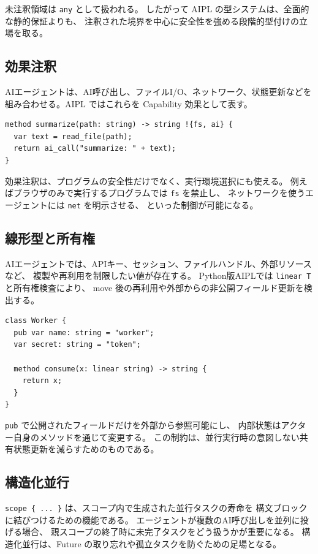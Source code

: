 \documentclass[11pt,a4paper,uplatex,dvipdfmx]{jsarticle}
\newcommand{\code}[1]{\texttt{#1}}
\begin{document}
未注釈領域は \code{any} として扱われる。
したがって AIPL の型システムは、全面的な静的保証よりも、
注釈された境界を中心に安全性を強める段階的型付けの立場を取る。

\subsection{効果注釈}

AIエージェントは、AI呼び出し、ファイルI/O、ネットワーク、状態更新などを
組み合わせる。AIPL ではこれらを Capability 効果として表す。

\begin{lstlisting}
method summarize(path: string) -> string !{fs, ai} {
  var text = read_file(path);
  return ai_call("summarize: " + text);
}
\end{lstlisting}

効果注釈は、プログラムの安全性だけでなく、実行環境選択にも使える。
例えばブラウザのみで実行するプログラムでは \code{fs} を禁止し、
ネットワークを使うエージェントには \code{net} を明示させる、
といった制御が可能になる。

\subsection{線形型と所有権}

AIエージェントでは、APIキー、セッション、ファイルハンドル、外部リソースなど、
複製や再利用を制限したい値が存在する。
Python版AIPLでは \code{linear T} と所有権検査により、
move 後の再利用や外部からの非公開フィールド更新を検出する。

\begin{lstlisting}
class Worker {
  pub var name: string = "worker";
  var secret: string = "token";

  method consume(x: linear string) -> string {
    return x;
  }
}
\end{lstlisting}

\code{pub} で公開されたフィールドだけを外部から参照可能にし、
内部状態はアクター自身のメソッドを通じて変更する。
この制約は、並行実行時の意図しない共有状態更新を減らすためのものである。

\subsection{構造化並行}

\code{scope \{ ... \}} は、スコープ内で生成された並行タスクの寿命を
構文ブロックに結びつけるための機能である。
エージェントが複数のAI呼び出しを並列に投げる場合、
親スコープの終了時に未完了タスクをどう扱うかが重要になる。
構造化並行は、Future の取り忘れや孤立タスクを防ぐための足場となる。
\end{document}
